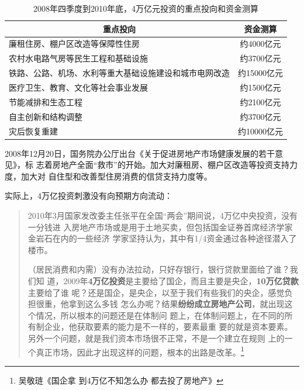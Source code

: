 \begin{table}[]
\centering
\begin{tabular}{@{}lc@{}}
\toprule
\multicolumn{1}{c}{重点投向}    & 资金测算     \\ \midrule
廉租住房、棚户区改造等保障性住房            & 约4000亿元  \\
农村水电路气房等民生工程和基础设施           & 约3700亿元  \\
铁路、公路、机场、水利等重大基础设施建设和城市电网改造 & 约15000亿元 \\
医疗卫生、教育、文化等社会事业发展           & 约1500亿元  \\
节能减排和生态工程                   & 约2100亿元  \\
自主创新和结构调整                   & 约3700亿元  \\
灾后恢复重建                      & 约10000亿元 \\ \bottomrule
\end{tabular}
\caption{2008年四季度到2010年底，4万亿元投资的重点投向和资金测算}
\label{tab:4wanyi}
\end{table}

2008年12月20日，国务院办公厅出台《关于促进房地产市场健康发展的若干意见》，标
志着房地产全面“救市”的开始。加大对廉租房、棚户区改造等投资支持力度，加大对
自住型和改善型住房消费的信贷支持力度等。

实际上，4万亿投资刺激没有向预期方向流动：
\begin{quotation}
2010年3月国家发改委主任张平在全国“两会”期间说，4万亿中央投资，没有一分钱进
入房地产市场或是用于土地买卖，但包括国金证券首席经济学家金岩石在内的一些经济
学家坚持认为，其中有1/4资金通过各种途径潜入了楼市。\cite{2011feiteng}

（居民消费和内需）没有办法拉动，只好存银行，银行贷款里面给了谁？我们知
道，2009年\textbf{4万亿投资}是主要给了国企，而且主要是央企，\textbf{10万亿贷款}主要给了谁
呢？还是国企，是央企，以至于我们有些我们的央企，感觉负担很重，他拿到这么多钱
怎么办呢？结果\textbf{纷纷成立房地产公司}，就出现这个情况，所以根本的问题还是在体制问
题上，在体制问题上，在不同的所有制企业，他获取要素的能力是不一样的，要素最重
要的就是资本要素。另外一个问题，就是我们资本市场很不正常，不是一个建立在规则
上的一个真正市场，因此才出现这样的问题，根本的出路是改革。\footnote{吴敬琏《国企拿
  到4万亿不知怎么办 都去投了房地产》}
\end{quotation}

